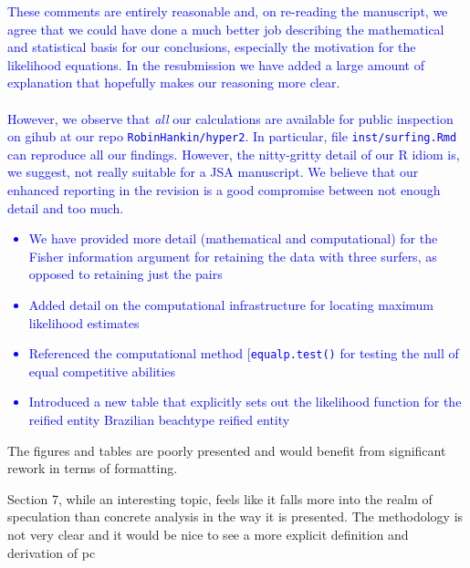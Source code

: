 \documentclass[12pt]{article}
\begin{document}
\textcolor{blue}{These comments are entirely reasonable and, on
  re-reading the manuscript, we agree that we could have done a much
  better job describing the mathematical and statistical basis for our
  conclusions, especially the motivation for the likelihood equations.
  In the resubmission we have added a large amount of explanation that
  hopefully makes our reasoning more clear.\\ \\
  However, we observe that {\em all} our calculations are available
  for public inspection on gihub at our repo {\tt RobinHankin/hyper2}.
  In particular, file {\tt inst/surfing.Rmd} can reproduce all our
  findings.  However, the nitty-gritty detail of our R idiom is, we
  suggest, not really suitable for a JSA manuscript.  We believe that
  our enhanced reporting in the revision is a good compromise between
  not enough detail and too much.
  \begin{itemize}
  \item We have provided more detail (mathematical and computational)
    for the Fisher information argument for retaining the data with
    three surfers, as opposed to retaining just the pairs
  \item Added detail on the computational infrastructure for locating
    maximum likelihood estimates
  \item Referenced the computational method [{\tt equalp.test()} for
    testing the null of equal competitive abilities
  \item Introduced a new table that explicitly sets out the likelihood
    function for the reified entity Brazilian beachtype reified entity
  \end{itemize}
}

  
The figures and tables are poorly presented and would benefit from
significant rework in terms of formatting.

Section 7, while an interesting topic, feels like it falls more into
the realm of speculation than concrete analysis in the way it is
presented. The methodology is not very clear and it would be nice to
see a more explicit definition and derivation of pc
\end{document}
